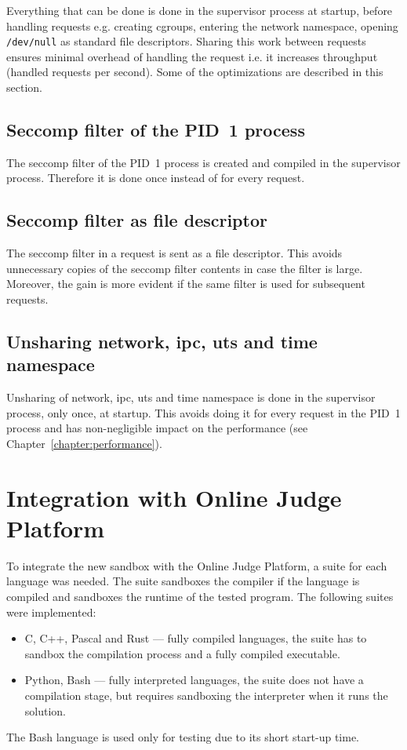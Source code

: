 \documentclass[en]{pracamgr}
\begin{document}
Everything that can be done is done in the supervisor process at startup, before handling requests e.g. creating cgroups, entering the network namespace, opening \texttt{/dev/null} as standard file descriptors. Sharing this work between requests ensures minimal overhead of handling the request i.e. it increases throughput (handled requests per second). Some of the optimizations are described in this section.

\subsection{Seccomp filter of the PID~1 process}

The seccomp filter of the PID~1 process is created and compiled in the supervisor process. Therefore it is done once instead of for every request.

\subsection{Seccomp filter as file descriptor}

The seccomp filter in a request is sent as a file descriptor. This avoids unnecessary copies of the seccomp filter contents in case the filter is large. Moreover, the gain is more evident if the same filter is used for subsequent requests.

\subsection{Unsharing network, ipc, uts and time namespace}

Unsharing of network, ipc, uts and time namespace is done in the supervisor process, only once, at startup. This avoids doing it for every request in the PID~1 process and has non-negligible impact on the performance (see Chapter~\ref{chapter:performance}).

\section{Integration with Online Judge Platform}

To integrate the new sandbox with the Online Judge Platform, a suite for each language was needed. The suite sandboxes the compiler if the language is compiled and sandboxes the runtime of the tested program. The following suites were implemented:

\begin{itemize}
    \item C, C++, Pascal and Rust --- fully compiled languages, the suite has to sandbox the compilation process and a fully compiled executable.
    \item Python, Bash --- fully interpreted languages, the suite does not have a compilation stage, but requires sandboxing the interpreter when it runs the solution.
\end{itemize}
The Bash language is used only for testing due to its short start-up time.
\end{document}
